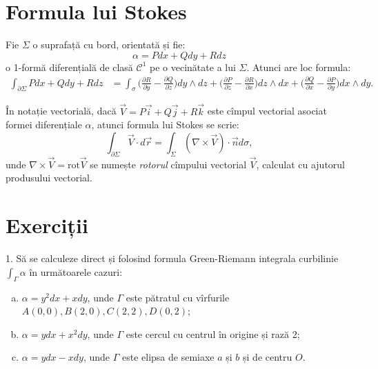\documentclass[11pt,a4paper]{article}
\newcommand\kal{\mathcal}
\theoremstyle{dotless}
\theoremstyle{dotlessdr}
\begin{document}
\section{Formula lui Stokes}
\label{sec:stokes}

Fie $\Sigma$ o suprafață cu bord, orientată și fie:
\[
  \alpha = Pdx + Qdy + Rdz
\]
o 1-formă diferențială de clasă $\kal{C}^1$ pe o vecinătate a lui $\Sigma$.
Atunci are loc formula:
\begin{align*}
  \int_{\partial \Sigma} Pdx + Qdy + Rdz &= \int_\sigma \Big( \frac{\partial R}{\partial y} -
                                           \frac{\partial Q}{\partial z} \Big) dy \wedge dz +
                                           \Big( \frac{\partial P}{\partial z} -
                                           \frac{\partial R}{\partial x} \Big) dz \wedge dx +
                                           \Big( \frac{\partial Q}{\partial x} -
                                           \frac{\partial P}{\partial y}\Big) dx \wedge dy.
\end{align*}

În notație vectorială, dacă $\vec{V} = P \vec{i} + Q \vec{j} + R \vec{k}$ este cîmpul
vectorial asociat formei diferențiale $\alpha$, atunci formula lui Stokes se scrie:
\[
  \int_{\partial \Sigma} \vec{V} \cdot d\vec{r} = \int_\Sigma (\nabla \times \vec{V}) %
  \cdot \vec{n} d \sigma,
\]
unde $\nabla \times \vec{V} = \mathrm{rot}\vec{V}$ se numește \emph{rotorul} cîmpului
vectorial $\vec{V}$, calculat cu ajutorul produsului vectorial.


\section{Exerciții}
\label{sec:exc-f}

1. Să se calculeze direct și folosind formula Green-Riemann integrala curbilinie
$\int_\Gamma \alpha$ în următoarele cazuri:
\begin{enumerate}[(a)]
\item $\alpha = y^2 dx + xdy$, unde $\Gamma$ este pătratul cu vîrfurile
  $A(0, 0), B(2, 0), C(2,2), D(0, 2)$;
\item $\alpha = ydx + x^2 dy$, unde $\Gamma$ este cercul cu centrul în origine și
  rază 2;
\item $\alpha = ydx - xdy$, unde $\Gamma$ este elipsa de semiaxe $a$ și $b$ și de
  centru $O$.
\end{enumerate}
\end{document}
